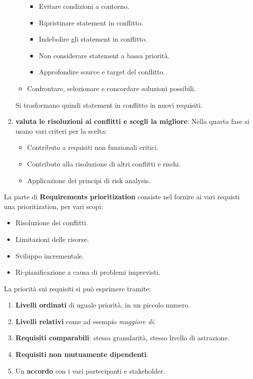 \begin{enumerate}
\begin{itemize}
                        \begin{itemize}
                              \item Evitare condizioni a contorno.
                              \item Ripristinare statement in conflitto.
                              \item Indebolire gli statement in conflitto.
                              \item Non considerare statement a bassa priorità.
                              \item Approfondire source e target del conflitto.
                        \end{itemize}
                  \item Confrontare, selezionare e concordare soluzioni possibili.
            \end{itemize}
            Si trasformano quindi statement in conflitto in nuovi requisiti.
      \item \textbf{valuta le risoluzioni ai conflitti e scegli la migliore}: 
            Nella quarta fase si usano vari criteri per la scelta:
            \begin{itemize}
                  \item Contributo a requisiti non funzionali critici.
                  \item Contributo alla risoluzione di altri conflitti e rischi.
                  \item Applicazione dei principi di risk analysis.
            \end{itemize}
\end{enumerate}
La parte di \textbf{Requirements prioritization} consiste nel fornire ai vari
requisti una prioritization, per vari scopi:
\begin{itemize}
      \item Risoluzione dei conflitti.
      \item Limitazioni delle risorse.
      \item Sviluppo incrementale.
      \item Ri-pianificazione a causa di problemi imprevisti.
\end{itemize}
La priorità sui requisiti si può esprimere tramite:
\begin{enumerate}
      \item \textbf{Livelli ordinati} di uguale priorità, in un piccolo numero.
      \item \textbf{Livelli relativi} come ad esempio \textit{maggiore di}.
      \item \textbf{Requisiti comparabili}: stessa granularità, stesso livello di
            astrazione.
      \item \textbf{Requisiti non mutuamente dipendenti}.
      \item Un \textbf{accordo} con i vari partecipanti e stakeholder.
\end{enumerate}
